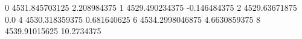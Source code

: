 0 4531.845703125 2.208984375
1 4529.490234375 -0.146484375
2 4529.63671875 0.0
4 4530.318359375 0.681640625
6 4534.2998046875 4.6630859375
8 4539.91015625 10.2734375
